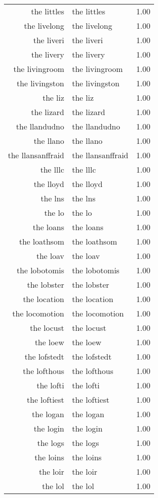 \begin{table}[ht]
\begin{tabular}{rlr}
  the littles & the littles & 1.00 \\ 
  the livelong & the livelong & 1.00 \\ 
  the liveri & the liveri & 1.00 \\ 
  the livery & the livery & 1.00 \\ 
  the livingroom & the livingroom & 1.00 \\ 
  the livingston & the livingston & 1.00 \\ 
  the liz & the liz & 1.00 \\ 
  the lizard & the lizard & 1.00 \\ 
  the llandudno & the llandudno & 1.00 \\ 
  the llano & the llano & 1.00 \\ 
  the llansanffraid & the llansanffraid & 1.00 \\ 
  the lllc & the lllc & 1.00 \\ 
  the lloyd & the lloyd & 1.00 \\ 
  the lns & the lns & 1.00 \\ 
  the lo & the lo & 1.00 \\ 
  the loans & the loans & 1.00 \\ 
  the loathsom & the loathsom & 1.00 \\ 
  the loav & the loav & 1.00 \\ 
  the lobotomis & the lobotomis & 1.00 \\ 
  the lobster & the lobster & 1.00 \\ 
  the location & the location & 1.00 \\ 
  the locomotion & the locomotion & 1.00 \\ 
  the locust & the locust & 1.00 \\ 
  the loew & the loew & 1.00 \\ 
  the lofstedt & the lofstedt & 1.00 \\ 
  the lofthous & the lofthous & 1.00 \\ 
  the lofti & the lofti & 1.00 \\ 
  the loftiest & the loftiest & 1.00 \\ 
  the logan & the logan & 1.00 \\ 
  the login & the login & 1.00 \\ 
  the logs & the logs & 1.00 \\ 
  the loins & the loins & 1.00 \\ 
  the loir & the loir & 1.00 \\ 
  the lol & the lol & 1.00 \\ 

\end{tabular}
\end{table}
